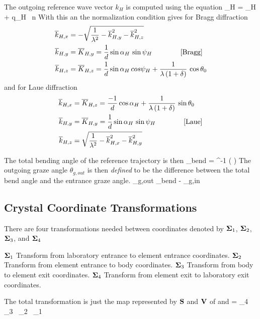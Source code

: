 The outgoing reference wave vector $k_H$ is computed using the equation
\Begineq
  \bfK_H = \bfk_H + q_H \, \bfhat n
  \label{kkqn2}
\Endeq
With this an the normalization condition  gives for Bragg diffraction
\begin{align}
  \overline{k}_{H,x} &= -\sqrt{\frac{1}{\lambda^2} - \overline{k}_{H,y}^2 - \overline{k}_{H,z}^2} \nonumber \\
  \overline{k}_{H,y} &= \overline{K}_{H,y} = \frac{1}{d} \sin\alpha_H \, \sin\psi_H 
  \qquad \qquad [\mbox{Bragg}] 
  \label{k1dapb} \\
  \overline{k}_{H,z} &= \overline{K}_{H,z} = \frac{1}{d} \sin\alpha_H \, cos\psi_H + 
    \frac{1}{\lambda \, (1 + \delta)} \, \cos\theta_0 \nonumber
\end{align}
and for Laue diffraction
\begin{align}
  \overline{k}_{H,x} &= \overline{K}_{H,z} = \frac{-1}{d} \cos\alpha_H + 
    \frac{1}{\lambda \, (1 + \delta)} \, \sin\theta_0 \nonumber \\
  \overline{k}_{H,y} &= \overline{K}_{H,y} = \frac{1}{d} \sin\alpha_H \, \sin\psi_H 
  \qquad \qquad [\mbox{Laue}] 
  \label{k1dapl} \\
  \overline{k}_{H,z} &= \sqrt{\frac{1}{\lambda^2} - \overline{k}_{H,x}^2 - \overline{k}_{H,y}^2} \nonumber
\end{align}

The total bending angle of the reference trajectory is then
\Begineq
  \theta_{bend} = \tan^{-1} 
  \left(  \right)
\Endeq
The outgoing graze angle $\theta_{g,out}$ is then {\em defined} to be
the difference between the total bend angle and the entrance graze angle.
\Begineq
  \theta_{g,out} \equiv \theta_{bend} - \theta_{g,in}
\Endeq

\subsection{Crystal Coordinate Transformations}
\label{ss:crystal.trans}

There are four transformations needed between coordinates
denoted by ${\bf \Sigma}_1$, ${\bf \Sigma}_2$, ${\bf \Sigma}_3$, and ${\bf \Sigma}_4$
\begin{example}
  \({\bf \Sigma}_1\)  Transform from laboratory entrance to element entrance coordinates.  
  \({\bf \Sigma}_2\)  Transform from element entrance to body coordinates.  
  \({\bf \Sigma}_3\)  Transform from body to element exit coordinates.  
  \({\bf \Sigma}_4\)  Transform from element exit to laboratory exit coordinates.  
\end{example}
The total transformation is just the map represented by ${\bf S}$ and
${\bf V}$ of  and 
\Begineq
  [\bfS, \bfV] = \Bf\Sigma_4 \, \Bf\Sigma_3 \, \Bf\Sigma_2 \, \Bf\Sigma_1
\Endeq

